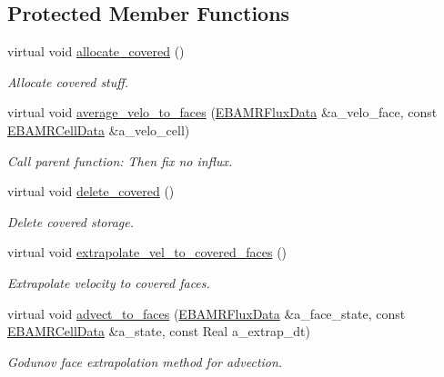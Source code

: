 \subsection*{Protected Member Functions}
\begin{DoxyCompactItemize}
\item 
virtual void \hyperlink{classcdr__gdnv_aa79e68a7104475010b540b661c1bdcd2}{allocate\+\_\+covered} ()
\begin{DoxyCompactList}\small\item\em Allocate covered stuff. \end{DoxyCompactList}\item 
virtual void \hyperlink{classcdr__gdnv_ae14ecdcef78fda2f4ff20943ee1807ad}{average\+\_\+velo\+\_\+to\+\_\+faces} (\hyperlink{type__definitions_8H_aadad278b2e5d3d4abcf9032f90ba78c3}{E\+B\+A\+M\+R\+Flux\+Data} \&a\+\_\+velo\+\_\+face, const \hyperlink{type__definitions_8H_a7e610f301989e5e07781c5e338bdb7c3}{E\+B\+A\+M\+R\+Cell\+Data} \&a\+\_\+velo\+\_\+cell)
\begin{DoxyCompactList}\small\item\em Call parent function\+: Then fix no influx. \end{DoxyCompactList}\item 
virtual void \hyperlink{classcdr__gdnv_a026d3529805f29aea6b3741e2376a310}{delete\+\_\+covered} ()
\begin{DoxyCompactList}\small\item\em Delete covered storage. \end{DoxyCompactList}\item 
virtual void \hyperlink{classcdr__gdnv_afb161587cb9a8a23785e746144ee0b32}{extrapolate\+\_\+vel\+\_\+to\+\_\+covered\+\_\+faces} ()
\begin{DoxyCompactList}\small\item\em Extrapolate velocity to covered faces. \end{DoxyCompactList}\item 
virtual void \hyperlink{classcdr__gdnv_a21c849943c1fb1f295572bc8b92c136e}{advect\+\_\+to\+\_\+faces} (\hyperlink{type__definitions_8H_aadad278b2e5d3d4abcf9032f90ba78c3}{E\+B\+A\+M\+R\+Flux\+Data} \&a\+\_\+face\+\_\+state, const \hyperlink{type__definitions_8H_a7e610f301989e5e07781c5e338bdb7c3}{E\+B\+A\+M\+R\+Cell\+Data} \&a\+\_\+state, const Real a\+\_\+extrap\+\_\+dt)
\begin{DoxyCompactList}\small\item\em Godunov face extrapolation method for advection. \end{DoxyCompactList}\item 

\end{DoxyCompactItemize}
